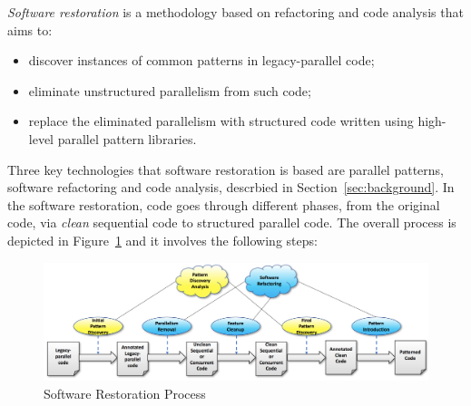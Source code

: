 \documentclass{llncs}
\begin{document}
\noindent
\emph{Software restoration} is a methodology based on refactoring and code analysis that aims to:
\begin{itemize}
\item discover instances of common patterns in legacy-parallel code;
\item eliminate unstructured parallelism from such code;
  \item replace the eliminated parallelism with structured code written using high-level parallel pattern libraries.
\end{itemize}
Three key technologies that software restoration is based are parallel patterns, software refactoring and code analysis, descrbied in Section~\ref{sec:background}. In the software restoration, code goes through different phases, from the original code, via \emph{clean} sequential code to structured parallel code. The overall process is depicted in Figure~\ref{fig:SoftRest} and it involves the following steps: 

\begin{figure}
\centering
\begin{minipage}{0.99\textwidth}
\includegraphics{images/SoftRest.png}
\end{minipage}
\caption{Software Restoration Process}
\label{fig:SoftRest}
\end {figure}
\end{document}
